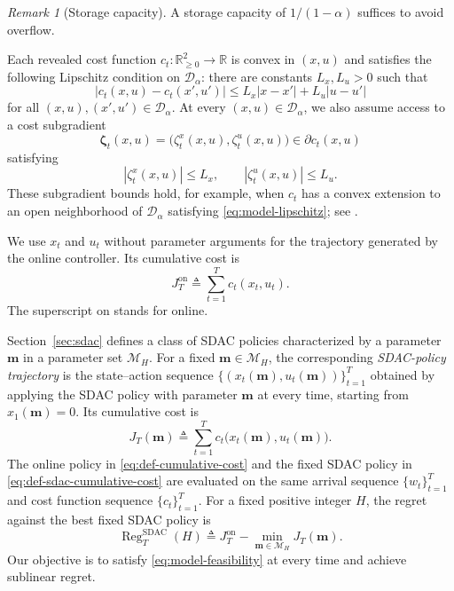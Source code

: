 \documentclass[journal]{IEEEtran}
\theoremstyle{remark}
\newtheorem{remark}{Remark}
\newcommand{\RegSDAC}[1]{\operatorname{Reg}_{#1}^{\mathrm{SDAC}}}
\begin{document}
\begin{remark}[Storage capacity]
A storage capacity of $1/(1-\alpha)$ suffices to avoid overflow.
\end{remark}

Each revealed cost function $c_t:\mathbb{R}_{\ge0}^2\to\mathbb{R}$ is convex in
$(x,u)$ and satisfies the following Lipschitz condition on $\mathcal{D}_\alpha$:
there are constants $L_x,L_u>0$ such that
\begin{equation}
\label{eq:model-lipschitz}
|c_t(x,u)-c_t(x',u')|
\le
L_x|x-x'|+L_u|u-u'|
\end{equation}
for all $(x,u),(x',u')\in\mathcal{D}_\alpha$.
At every $(x,u)\in\mathcal{D}_\alpha$, we also assume access to a cost subgradient
\begin{equation}
\label{eq:model-cost-subgradient}
\boldsymbol{\zeta}_t(x,u)
=
\bigl(\zeta_t^x(x,u),\zeta_t^u(x,u)\bigr)
\in\partial c_t(x,u)
\end{equation}
satisfying
\begin{equation}
\label{eq:model-subgradient-bounds}
|\zeta_t^x(x,u)|\le L_x,
\qquad
|\zeta_t^u(x,u)|\le L_u.
\end{equation}
These subgradient bounds hold, for example, when $c_t$ has a convex
extension to an open neighborhood of $\mathcal{D}_\alpha$ satisfying
\eqref{eq:model-lipschitz}; see
\cite[Thm.~9.13]{rockafellar1998variational}.

We use $x_t$ and $u_t$ without parameter arguments for the trajectory generated by
the online controller. Its cumulative cost is
\begin{equation}
\label{eq:def-cumulative-cost}
J_T^{\mathrm{on}}
\triangleq
\sum_{t=1}^T c_t(x_t,u_t).
\end{equation}
The superscript $\mathrm{on}$ stands for online.


Section~\ref{sec:sdac} defines a class of SDAC policies characterized by a
parameter $\mathbf{m}$ in a parameter set $\mathcal{M}_H$.
For a fixed $\mathbf{m}\in\mathcal{M}_H$, the corresponding \emph{SDAC-policy
trajectory} is the state--action
sequence $\{(x_t(\mathbf{m}),u_t(\mathbf{m}))\}_{t=1}^T$ obtained by applying
the SDAC policy with parameter $\mathbf{m}$ at every time, starting from
$x_1(\mathbf{m})=0$.
Its cumulative cost is
\begin{equation}
\label{eq:def-sdac-cumulative-cost}
J_T(\mathbf{m})
\triangleq
\sum_{t=1}^T c_t\bigl(x_t(\mathbf{m}),u_t(\mathbf{m})\bigr).
\end{equation}
The online policy in \eqref{eq:def-cumulative-cost} and the fixed SDAC policy in
\eqref{eq:def-sdac-cumulative-cost} are evaluated on the same arrival sequence
$\{w_t\}_{t=1}^T$ and cost function sequence $\{c_t\}_{t=1}^T$.
For a fixed positive integer $H$, the regret against the best fixed
SDAC policy is
\begin{equation}
\label{eq:def-regret}
\RegSDAC{T}(H)
\triangleq
J_T^{\mathrm{on}}
-\min_{\mathbf{m}\in\mathcal{M}_H}J_T(\mathbf{m}).
\end{equation}
Our objective is to satisfy \eqref{eq:model-feasibility} at every time and achieve
sublinear regret.
\end{document}
